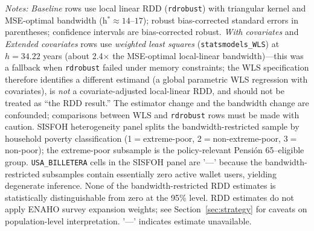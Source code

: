 \begin{threeparttable}
\begin{tablenotes}
\item \textit{Notes:} \textit{Baseline} rows use local linear RDD (\texttt{rdrobust}) with triangular kernel and MSE-optimal bandwidth (h$^{\ast}\!\approx\!14$--$17$); robust bias-corrected standard errors in parentheses; confidence intervals are bias-corrected robust. \textit{With covariates} and \textit{Extended covariates} rows use \emph{weighted least squares} (\texttt{statsmodels\_WLS}) at $h\!=\!34.22$ years (about 2.4$\times$ the MSE-optimal local-linear bandwidth)---this was a fallback when \texttt{rdrobust} failed under memory constraints; the WLS specification therefore identifies a different estimand (a global parametric WLS regression with covariates), is \emph{not} a covariate-adjusted local-linear RDD, and should not be treated as ``the RDD result.'' The estimator change and the bandwidth change are confounded; comparisons between WLS and \texttt{rdrobust} rows must be made with caution. SISFOH heterogeneity panel splits the bandwidth-restricted sample by household poverty classification (1$=$extreme-poor, 2$=$non-extreme-poor, 3$=$non-poor); the extreme-poor subsample is the policy-relevant Pensi\'on 65--eligible group. \texttt{USA\_BILLETERA} cells in the SISFOH panel are '---' because the bandwidth-restricted subsamples contain essentially zero active wallet users, yielding degenerate inference. None of the bandwidth-restricted RDD estimates is statistically distinguishable from zero at the 95\% level. RDD estimates do not apply ENAHO survey expansion weights; see Section~\ref{sec:strategy} for caveats on population-level interpretation. '---' indicates estimate unavailable.
\end{tablenotes}
\end{threeparttable}